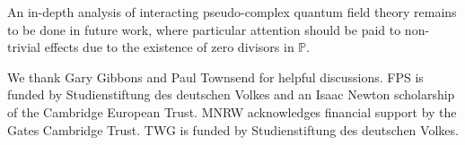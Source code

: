 \documentclass[a4paper,aps,prd,showkeys,showpacs,superscriptaddress,preprint]{revtex4}
\newcommand{\pc}{\mathbb{P}}
\begin{document}
An in-depth analysis of interacting pseudo-complex quantum field
theory remains to be done in future work, where particular attention should
be paid to non-trivial effects due to the existence of zero divisors
in $\pc$.


\begin{acknowledgments}
  We thank Gary Gibbons and Paul Townsend for helpful discussions. 
  FPS is funded by Studienstiftung des deutschen Volkes and an Isaac Newton
  scholarship of the Cambridge European Trust. MNRW acknowledges
  financial support by the Gates Cambridge Trust. TWG is funded by
  Studienstiftung des deutschen Volkes.  
\end{acknowledgments}

%
\end{document}
